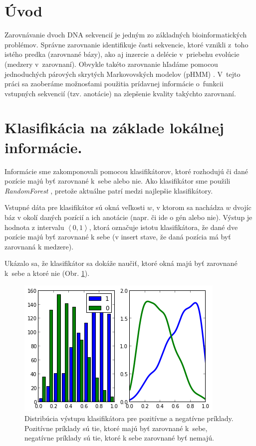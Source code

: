 \documentclass[myposter,portrait]{sciposter}
\def\mysection#1{
{\color{sectionCol}\section*{\sc\bfseries #1}}}
\begin{document}
\begin{multicols*}{3}

\mysection{Úvod}

Zarovnávanie dvoch DNA sekvencií je jedným zo základných
bioinformatických problémov. Správne zarovnanie identifikuje časti
sekvencie, ktoré vznikli z~toho istého predka (zarovnané bázy), ako aj
inzercie a delécie v~priebehu evolúcie (medzery v~zarovnaní). Obvykle
takéto zarovnanie hľadáme pomocou jednoduchých párových skrytých
Markovovských modelov (pHMM) \cite{durbin}. V~tejto práci sa zaoberáme
možnosťami použitia prídavnej informácie o~funkcii vstupných sekvencií
(tzv. anotácie) na zlepšenie kvality takýchto zarovnaní.

\mysection{Klasifikácia na základe lokálnej informácie.}

Informácie sme zakomponovali pomocou klasifikátorov, ktoré rozhodujú či dané pozície majú byť zarovnané k~sebe alebo nie. Ako klasifikátor sme použili \emph{RandomForest} \cite{randomForestPaper}, pretože aktuálne patrí medzi najlepšie klasifikátory.

Vstupné dáta pre klasifikátor sú okná veľkosti $w$, v ktorom sa nachádza $w$ dvojíc báz v okolí daných pozícií a ich anotácie (napr. či ide o gén alebo nie). Výstup je hodnota z intervalu $\left<0,1\right>$, ktorá označuje istotu klasifikátora, že dané dve pozície majú byť zarovnané k sebe (v insert stave, že daná pozícia má byť zarovnaná k medzere).

Ukázalo sa, že klasifikátor sa dokáže naučiť, ktoré okná majú byť zarovnané k~sebe a ktoré nie (Obr. \ref{fig:clf-m-dist}).

\begin{figure}[htp]
    \centering
    \includegraphics[width=\textwidth, clip=true]{images/clf_m_test}
    \caption{Distribúcia výstupu klasifikátora pre pozitívne a negatívne príklady. Pozitívne príklady sú tie, ktoré majú byť zarovnané k~sebe, negatívne príklady sú tie, ktoré k sebe zarovnané byť nemajú.}
    \label{fig:clf-m-dist}
\end{figure}


\end{multicols*}
\end{document}
